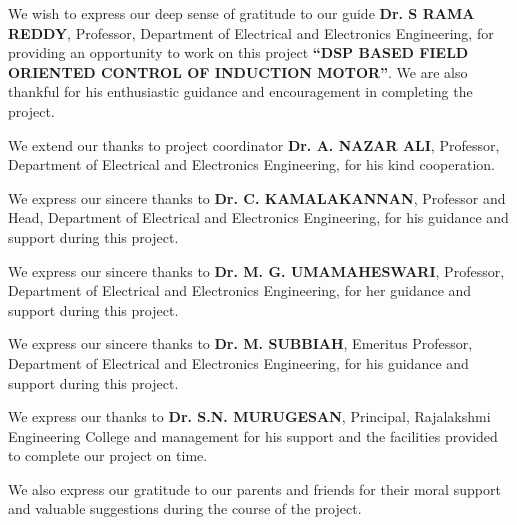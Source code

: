 

    


\vspace{1em} %

We wish to express our deep sense of gratitude to our guide \textbf{Dr. S RAMA REDDY}, Professor, Department of Electrical and Electronics Engineering, for providing an opportunity to work on this project \textbf{``DSP BASED FIELD ORIENTED CONTROL OF INDUCTION MOTOR''}. We are also thankful for his enthusiastic guidance and encouragement in completing the project.

\vspace{0.5em} %
We extend our thanks to project coordinator \textbf{Dr. A. NAZAR ALI}, Professor, Department of Electrical and Electronics Engineering, for his kind cooperation.

\vspace{0.5em} %
We express our sincere thanks to \textbf{Dr. C. KAMALAKANNAN}, Professor and Head, Department of Electrical and Electronics Engineering, for his guidance and support during this project.

\vspace{0.5em} %
We express our sincere thanks to \textbf{Dr. M. G. UMAMAHESWARI}, Professor, Department of Electrical and Electronics Engineering, for her guidance and support during this project.

\vspace{0.5em} %
We express our sincere thanks to \textbf{Dr. M. SUBBIAH}, Emeritus Professor, Department of Electrical and Electronics Engineering, for his guidance and support during this project.

\vspace{0.5em} %
We express our thanks to \textbf{Dr. S.N. MURUGESAN}, Principal, Rajalakshmi Engineering College and management for his support and the facilities provided to complete our project on time.

\vspace{0.5em} %
We also express our gratitude to our parents and friends for their moral support and valuable suggestions during the course of the project.


\newpage